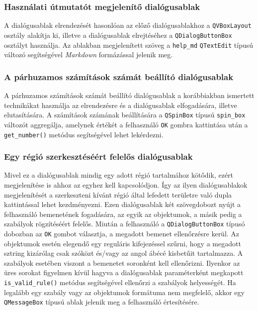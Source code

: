 \subsubsection{Használati útmutatót megjelenítő dialógusablak}

A dialógusablak elrendezését hasonlóan az előző dialógusablakhoz a \verb|QVBoxLayout| osztály alakítja ki, illetve a dialógusablak elrejtéséhez a \verb|QDialogButtonBox| osztályt használja. Az ablakban megjelenített szöveg a \verb|help_md| \verb|QTextEdit| típusú változó segítségével \textit{Markdown} formázással jelenik meg.

\subsubsection{A párhuzamos számítások számát beállító dialógusablak}

A párhuzamos számítások számát beállító dialógusablak a korábbiakban ismertett technikákat használja az elrendezésre és a dialógusablak elfogadására, illetve elutasítására. A számítások számának beállítására a \verb|QSpinBox| típusú \verb|spin_box| változót aggregálja, amelynek értékét a felhasználó \verb|OK| gombra kattintása után a \verb|get_number()| metódus segítségével lehet lekérdezni.

\subsubsection{Egy régió szerkesztéséért felelős dialógusablak} 

Mivel ez a dialógusablak mindig egy adott régió tartalmához kötődik, ezért megjelenítése is ahhoz az egyhez kell kapcsolódjon. Így az ilyen dialógusablakok megjelenítését a szerkeszteni kívánt régió által lefedett területre való dupla kattintással lehet kezdményezni. Ezen dialógusablak két szövegdobozt nyújt a felhasználó bemenetének fogadására, az egyik az objektumok, a másik pedig a szabályok rögzítéséért felelős. Miután a felhasználó a \verb|QDialogButtonBox| típusó dobozban az \verb|OK| gombot választja, a megadott bemenet ellenőrzésre kerül. Az objektumok esetén elegendő egy reguláris kifejezéssel szűrni, hogy a megadott sztring kizárólag csak szóközt és/vagy az angol ábécé kisbetűit tartalmazza. A szabályok esetében viszont a bemenetet soronként kell ellenőrizni. Ilyenkor az üres sorokat figyelmen kívül hagyva a dialógusablak paraméterként megkapott \verb|is_valid_rule()| metódus segítségével ellenőrzi a szabályok helyességét. Ha legalább egy szabály vagy az objektumok formátuma nem megfelelő, akkor egy \verb|QMessageBox| típusú ablak jelenik meg a felhasználó értesítésére. 

